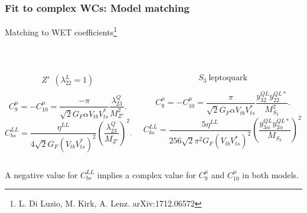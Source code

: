\documentclass[mathserif, 10pt]{beamer}
\begin{document}
\begin{frame}\frametitle{Fit to complex WCs: Model matching}
Matching to WET coefficients\footnote[7]{L. Di Luzio, M. Kirk, A. Lenz. arXiv:1712.06572}

~

\begin{columns}
\begin{column}{0.52\textwidth}
$$Z'\ \ (\lambda^L_{22} = 1)$$

{\small $$C_9^\mu = - C_{10}^\mu = \frac{-\pi}{\sqrt{2} G_F \alpha V_{tb} V_{ts}^*}\frac{\lambda^Q_{23}}{M_{Z'}^2}.$$}
{\small $$C_{bs}^{LL} = \frac{\eta^{LL}}{4\sqrt{2}G_F (V_{tb} V_{ts}^*)^2}\left(\frac{\lambda_{23}^Q}{M_{Z'}}\right)^2.$$}

        \end{column}
\begin{column}{0.56\textwidth}
$$S_3\ \text{leptoquark}$$

{\small $$C_9^\mu = -C_{10}^\mu = \frac{\pi}{\sqrt{2} G_F \alpha V_{tb} V_{ts}^*} \frac{y^{QL}_{32} y^{QL*}_{22}}{M^2_{S_3}}.$$}
{\small $$C_{bs}^{LL} = \frac{5\eta^{LL}}{256 \sqrt{2} \pi^2 G_F (V_{tb} V_{ts}^*)^2}\left(\frac{y^{QL}_{3\alpha} y^{QL*}_{2\alpha}}{M_{S_3}}\right)^2.$$}

        \end{column}
\end{columns}

\vspace{1cm}

A negative value for $C_{bs}^{LL}$ implies a complex value for $C_9^\mu$ and $C_{10}^\mu$ in both models.

\end{frame}
\end{document}
